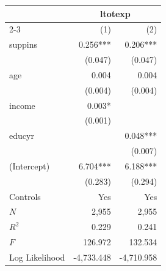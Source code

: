 \begin{tabular}{lrr}
\toprule
               & \multicolumn{2}{c}{ltotexp} \\ 
\cmidrule(lr){2-3} 
               &          (1) &          (2) \\ 
\midrule
suppins        &     0.256*** &     0.206*** \\ 
               &      (0.047) &      (0.047) \\ 
age            &        0.004 &        0.004 \\ 
               &      (0.004) &      (0.004) \\ 
income         &       0.003* &              \\ 
               &      (0.001) &              \\ 
educyr         &              &     0.048*** \\ 
               &              &      (0.007) \\ 
(Intercept)    &     6.704*** &     6.188*** \\ 
               &      (0.283) &      (0.294) \\ 
\midrule
Controls       &          Yes &          Yes \\ 
\midrule
$N$            &        2,955 &        2,955 \\ 
$R^2$          &        0.229 &        0.241 \\ 
$F$            &      126.972 &      132.534 \\ 
Log Likelihood &   -4,733.448 &   -4,710.958 \\ 
\bottomrule
\end{tabular}
